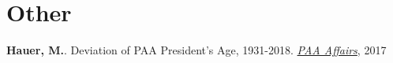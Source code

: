 
\section{Other}

\textbf{Hauer, M.}. Deviation of PAA President's Age, 1931-2018. \href{http://www.populationassociation.org/wp-content/uploads/PAA-Fall-2017.pdf}{\textit{PAA Affairs}}, 2017
